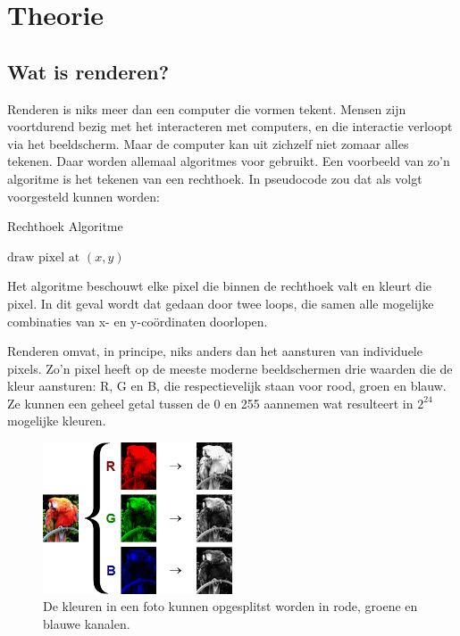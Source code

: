\documentclass[12pt, a4paper]{article}
\begin{document}
\section{Theorie}
\subsection{Wat is renderen?}
Renderen is niks meer dan een computer die vormen tekent. Mensen zijn voortdurend bezig met het interacteren met computers, en die interactie verloopt via het beeldscherm. Maar de computer kan uit zichzelf niet zomaar alles tekenen. Daar worden allemaal algoritmes voor gebruikt. Een voorbeeld van zo'n algoritme is het tekenen van een rechthoek. In pseudocode zou dat als volgt voorgesteld kunnen worden:
\begin{algorithm}
\caption{Rechthoek Algoritme}
\begin{algorithmic}[1]
		\State $\text{draw pixel at }(x, y)$
	    \EndFor
    \EndFor
\EndProcedure
\end{algorithmic}
\end{algorithm}

Het algoritme beschouwt elke pixel die binnen de rechthoek valt en kleurt die pixel. In dit geval wordt dat gedaan door twee loops, die samen alle mogelijke combinaties van x- en y-coördinaten doorlopen. 

Renderen omvat, in principe, niks anders dan het aansturen van individuele pixels. Zo'n pixel heeft op de meeste moderne beeldschermen drie waarden die de kleur aansturen: R, G en B, die respectievelijk staan voor rood, groen en blauw. Ze kunnen een geheel getal tussen de 0 en 255 aannemen wat resulteert in \(2^{24}\) mogelijke kleuren.
\begin{figure}[H]
\centering
\includegraphics[width=0.5\textwidth]{RGB_channels_separation.png}
\caption{De kleuren in een foto kunnen opgesplitst worden in rode, groene en blauwe kanalen.}
\label{fig:rgb_separated}
\end{figure}
\end{document}
